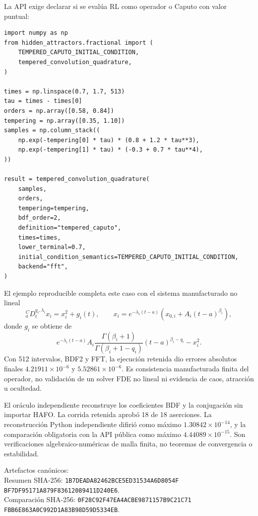 La API exige declarar si se evalúa RL como operador o Caputo con valor puntual:
\begin{verbatim}
import numpy as np
from hidden_attractors.fractional import (
    TEMPERED_CAPUTO_INITIAL_CONDITION,
    tempered_convolution_quadrature,
)

times = np.linspace(0.7, 1.7, 513)
tau = times - times[0]
orders = np.array([0.58, 0.84])
tempering = np.array([0.35, 1.10])
samples = np.column_stack((
    np.exp(-tempering[0] * tau) * (0.8 + 1.2 * tau**3),
    np.exp(-tempering[1] * tau) * (-0.3 + 0.7 * tau**4),
))

result = tempered_convolution_quadrature(
    samples,
    orders,
    tempering=tempering,
    bdf_order=2,
    definition="tempered_caputo",
    times=times,
    lower_terminal=0.7,
    initial_condition_semantics=TEMPERED_CAPUTO_INITIAL_CONDITION,
    backend="fft",
)
\end{verbatim}
El ejemplo reproducible
 completa este caso con
el sistema manufacturado no lineal
\[
 {}_a^CD_t^{q_i,\lambda_i}x_i=x_i^2+g_i(t),\qquad
 x_i=e^{-\lambda_i(t-a)}(x_{0,i}+A_i(t-a)^{\beta_i}),
\]
donde \(g_i\) se obtiene de
\[
 e^{-\lambda_i(t-a)}A_i
 \frac{\Gamma(\beta_i+1)}{\Gamma(\beta_i+1-q_i)}
 (t-a)^{\beta_i-q_i}-x_i^2.
\]
Con 512 intervalos, BDF2 y FFT, la ejecución retenida dio errores absolutos
finales \(4.21911\times10^{-6}\) y \(5.52861\times10^{-6}\). Es consistencia
manufacturada finita del
operador, no validación de un solver FDE no lineal ni evidencia de caos,
atracción u ocultedad.

El oráculo independiente
reconstruye los coeficientes BDF y la conjugación sin importar HAFO. La corrida
retenida aprobó 18 de 18 aserciones. La reconstrucción Python independiente
difirió como máximo \(1.30842\times10^{-14}\), y la comparación obligatoria
con la API pública como máximo \(4.44089\times10^{-15}\). Son verificaciones
algebraico-numéricas de malla finita, no teoremas de convergencia o estabilidad.
\begin{flushleft}
\small
Artefactos canónicos:
\\
Resumen SHA-256:
\texttt{1B7DEADA82462BCE}\allowbreak\texttt{5ED31534A6D8054F}\allowbreak
\texttt{BF7DF95171A879F8}\allowbreak\texttt{3612089411D240E6}.\\
Comparación SHA-256:
\texttt{0F28C92F47EA4ACB}\allowbreak\texttt{E9871157B9C21C71}\allowbreak
\texttt{FBB6E863A0C992D1}\allowbreak\texttt{A83B98D59D5334EB}.
\end{flushleft}


